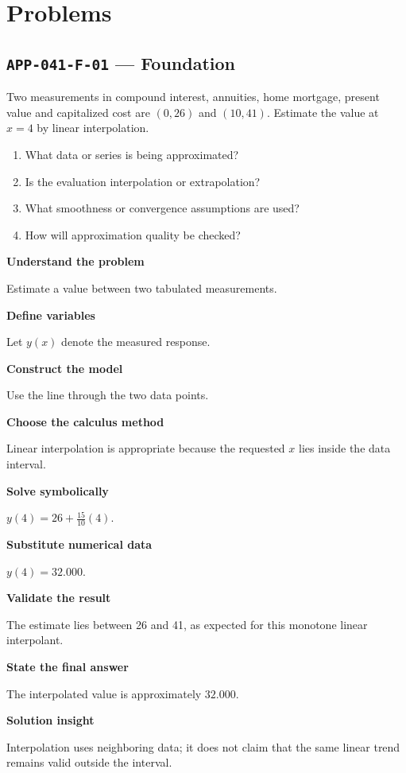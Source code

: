 \documentclass[11pt]{book}
\newcommand{\pid}[1]{\texttt{#1}}
\begin{document}
\section*{Problems}
\subsection*{\pid{APP-041-F-01} — Foundation}
\begin{problembox}
Two measurements in compound interest, annuities, home mortgage, present value and capitalized cost are $(0,26)$ and $(10,41)$. Estimate the value at $x=4$ by linear interpolation.
\end{problembox}
\begin{promptbox}\begin{enumerate}
\item What data or series is being approximated?
\item Is the evaluation interpolation or extrapolation?
\item What smoothness or convergence assumptions are used?
\item How will approximation quality be checked?
\end{enumerate}\end{promptbox}
\begin{solutionbox}
\textbf{Understand the problem}\par Estimate a value between two tabulated measurements.\par\medskip
\textbf{Define variables}\par Let $y(x)$ denote the measured response.\par\medskip
\textbf{Construct the model}\par Use the line through the two data points.\par\medskip
\textbf{Choose the calculus method}\par Linear interpolation is appropriate because the requested $x$ lies inside the data interval.\par\medskip
\textbf{Solve symbolically}\par $y(4)=26+\frac{15}{10}(4)$.\par\medskip
\textbf{Substitute numerical data}\par $y(4)=32.000$.\par\medskip
\textbf{Validate the result}\par The estimate lies between 26 and 41, as expected for this monotone linear interpolant.\par\medskip
\textbf{State the final answer}\par The interpolated value is approximately $32.000$.\par\medskip
\textbf{Solution insight}\par Interpolation uses neighboring data; it does not claim that the same linear trend remains valid outside the interval.\par\medskip
\end{solutionbox}
\end{document}
